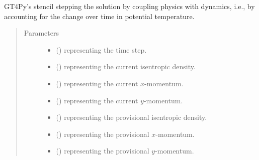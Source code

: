 \documentclass[letterpaper,10pt,english]{sphinxmanual}
\begin{document}
\begin{fulllineitems}
\begin{fulllineitems}
\label{\detokenize{api:dycore.prognostic_isentropic_forward_euler.PrognosticIsentropicForwardEuler._stencil_stepping_by_coupling_physics_with_dynamics_defs}}
GT4Py’s stencil stepping the solution by coupling physics with dynamics, i.e., by accounting for the
change over time in potential temperature.
\begin{quote}\begin{description}
\item[{Parameters}] \leavevmode\begin{itemize}
\item {} 
 () \textendash{}  representing the time step.

\item {} 
 () \textendash{}  representing the current isentropic density.

\item {} 
 () \textendash{}  representing the current \(x\)-momentum.

\item {} 
 () \textendash{}  representing the current \(y\)-momentum.

\item {} 
 () \textendash{}  representing the provisional isentropic density.

\item {} 
 () \textendash{}  representing the provisional \(x\)-momentum.

\item {} 
 () \textendash{}  representing the provisional \(y\)-momentum.


\end{itemize}
\end{description}
\end{quote}
\end{fulllineitems}
\end{fulllineitems}
\end{document}
